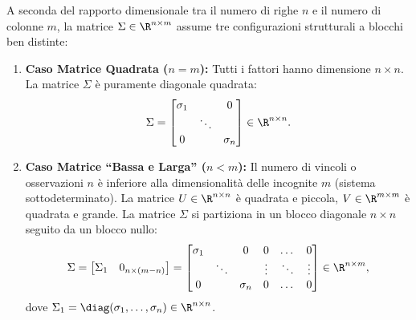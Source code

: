 A seconda del rapporto dimensionale tra il numero di righe $n$ e il numero di colonne $m$, la matrice $\Sigma \in \R^{n \times m}$ assume tre configurazioni strutturali a blocchi ben distinte:

\begin{enumerate}
    \item \textbf{Caso Matrice Quadrata ($n = m$):}
    Tutti i fattori hanno dimensione $n \times n$. La matrice $\Sigma$ \`e puramente diagonale quadrata:
    \begin{equation}
        \Sigma = \begin{bmatrix}
            \sigma_1 & & 0 \\
            & \ddots & \\
            0 & & \sigma_n
        \end{bmatrix} \in \R^{n \times n}.
    \end{equation}

    \item \textbf{Caso Matrice ``Bassa e Larga'' ($n < m$):}
    Il numero di vincoli o osservazioni $n$ \`e inferiore alla dimensionalit\`a delle incognite $m$ (sistema sottodeterminato). La matrice $U \in \R^{n \times n}$ \`e quadrata e piccola, $V \in \R^{m \times m}$ \`e quadrata e grande. La matrice $\Sigma$ si partiziona in un blocco diagonale $n \times n$ seguito da un blocco nullo:
    \begin{equation}
        \Sigma = \begin{bmatrix} \Sigma_1 & 0_{n \times (m - n)} \end{bmatrix} = \begin{bmatrix}
            \sigma_1 & & 0 & 0 & \dots & 0 \\
            & \ddots & & \vdots & \ddots & \vdots \\
            0 & & \sigma_n & 0 & \dots & 0
        \end{bmatrix} \in \R^{n \times m},
    \end{equation}
    dove $\Sigma_1 = \diag(\sigma_1, \dots, \sigma_n) \in \R^{n \times n}$.


\end{enumerate}
